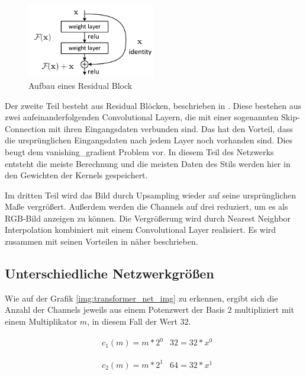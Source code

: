 \begin{figure}[H]
	\centering
	\includegraphics[width=0.50\textwidth]{resources/content/residual_block.png}
	\caption{Aufbau eines Residual Block \cite{residual_block_img}}
	\label{img:residual_block_img}
\end{figure}

Der zweite Teil besteht aus Residual Blöcken, beschrieben in \cite{DBLP:journals/corr/HeZRS15}. Diese bestehen aus zwei aufeinanderfolgenden Convolutional Layern, die mit einer sogenannten Skip-Connection mit ihren Eingangsdaten verbunden sind. Das hat den Vorteil, dass die ursprünglichen Eingangsdaten nach jedem Layer noch vorhanden sind. Dies beugt dem \gls{vanishing_gradient} Problem vor. In diesem Teil des Netzwerks entsteht die meiste Berechnung und die meisten Daten des Stils werden hier in den Gewichten der Kernels gespeichert.

Im dritten Teil wird das Bild durch Upsampling wieder auf seine ursprünglichen Maße vergrößert. Außerdem werden die Channels auf drei reduziert, um es als RGB-Bild anzeigen zu können. Die Vergrößerung wird durch Nearest Neighbor Interpolation kombiniert mit einem Convolutional Layer realisiert. Es wird zusammen mit seinen Vorteilen in \cite{odena2016deconvolution} näher beschrieben.

\pagebreak

\subsection{Unterschiedliche Netzwerkgrößen}

Wie auf der Grafik \ref{img:transformer_net_img} zu erkennen, ergibt sich die Anzahl der Channels jeweils aus einem Potenzwert der Basis $ 2 $ multipliziert mit einem Multiplikator $ m $, in diesem Fall der Wert $ 32 $.

\begin{align}
	& c_{1}(m) = m * 2^{0}
	& 32 = 32 * x^{0}
\end{align}

\begin{align}
	& c_{2}(m) = m * 2^{1}
	& 64 = 32 * x^{1}
\end{align}

